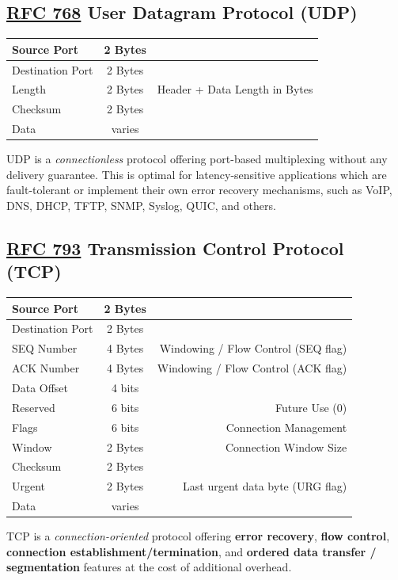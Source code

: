 \documentclass[12pt]{article}
\newcommand{\RFC}[1]{\href{https://datatracker.ietf.org/doc/html/rfc#1}{RFC #1}}
\begin{document}
	\subsection[RFC 768 UDP]{\RFC{768} User Datagram Protocol (UDP) \label{subsec:UDP}}
	\begin{table}[H]
	\centering
	\begin{tabular}{| l | c | r |}\hline
	Source Port		& 2 Bytes	& \Cref{tab:L4 PORTS KNOWN,tab:L4 PORTS REGISTERED}\\\hline
	Destination Port	& 2 Bytes	& \Cref{tab:L4 PORTS KNOWN,tab:L4 PORTS REGISTERED}\\\hline
	Length		& 2 Bytes	& Header + Data Length in Bytes\\\hline
	Checksum		& 2 Bytes	&\\\hline
	Data			& varies	&\\\hline
	\end{tabular}\end{table}
	UDP is a \textit{connectionless} protocol offering port-based multiplexing without any delivery guarantee. This is optimal for latency-sensitive applications which are fault-tolerant or implement their own error recovery mechanisms, such as VoIP, DNS, DHCP, TFTP, SNMP, Syslog, QUIC, and others.


	\subsection[RFC 793 TCP]{\RFC{793} Transmission Control Protocol (TCP) \label{subsec:TCP}}
	\begin{table}[H]
	\centering
	\begin{tabular}{| l | c | r |}\hline
	Source Port		& 2 Bytes	& \Cref{tab:L4 PORTS KNOWN,tab:L4 PORTS REGISTERED}\\\hline
	Destination Port	& 2 Bytes	& \Cref{tab:L4 PORTS KNOWN,tab:L4 PORTS REGISTERED}\\\hline
	SEQ Number	& 4 Bytes	& Windowing / Flow Control (SEQ flag)\\\hline
	ACK Number	& 4 Bytes	& Windowing / Flow Control (ACK flag)\\\hline
	Data Offset		& 4 bits	&\\\hline
	Reserved		& 6 bits	& Future Use (0)\\\hline
	Flags			& 6 bits	& Connection Management\\\hline
	Window		& 2 Bytes	& Connection Window Size\\\hline
	Checksum		& 2 Bytes	&\\\hline
	Urgent		& 2 Bytes	& Last urgent data byte (URG flag)\\\hline
	Data			& varies	&\\\hline
	\end{tabular}\end{table}
	TCP is a \textit{connection-oriented} protocol offering \textbf{error recovery}, \textbf{flow control}, \textbf{connection establishment/termination}, and \textbf{ordered data transfer / segmentation} features at the cost of additional overhead.
\end{document}
